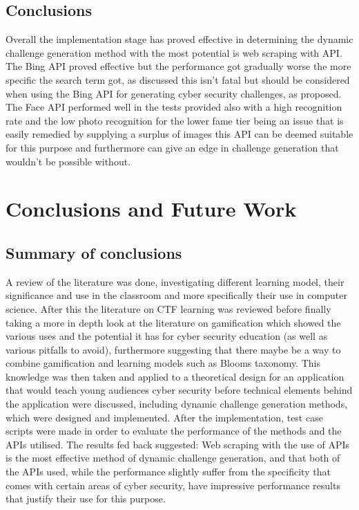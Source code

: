 \documentclass[12pt,a4paper]{article}
\begin{document}
\subsection{Conclusions} 

Overall the implementation stage has proved effective in determining the dynamic challenge generation method with the most potential is web scraping with API. The Bing API proved effective but the performance got gradually worse the more specific the search term got, as discussed this isn't fatal but should be considered when using the Bing API for generating cyber security challenges, as proposed. The Face API performed well in the tests provided also with a high recognition rate and the low photo recognition for the lower fame tier being an issue that is easily remedied by supplying a surplus of images this API can be deemed suitable for this purpose and furthermore can give an edge in challenge generation that wouldn't be possible without. 


\newpage
\section{Conclusions and Future Work} 
\subsection{Summary of conclusions}
A review of the literature was done, investigating different learning model, their significance and use in the classroom and more specifically their use in computer science. After this the literature on CTF learning was reviewed before finally taking a more in depth look at the literature on gamification which showed the various uses and the potential it has for cyber security education (as well as various pitfalls to avoid), furthermore suggesting that there maybe be a way to combine gamification and learning models such as Blooms taxonomy. This knowledge was then taken and applied to a theoretical design for an application that would teach young audiences cyber security before technical elements behind the application were discussed, including dynamic challenge generation methods, which were designed and implemented. After the implementation, test case scripts were made in order to evaluate the performance of the methods and the APIs utilised. The results fed back suggested: Web scraping with the use of APIs is the most effective method of dynamic challenge generation, and that both of the APIs used, while the performance slightly suffer from the specificity  that comes with certain areas of cyber security, have impressive performance results that justify their use for this purpose.
\end{document}
